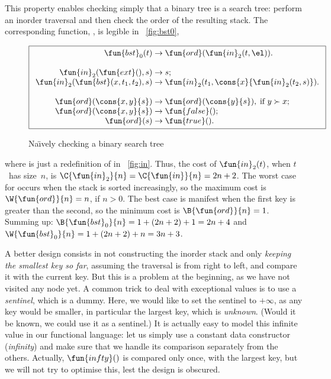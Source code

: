 This property enables checking simply that a binary tree is a search
tree: perform an inorder traversal and then check the order of the
resulting stack. The corresponding function,
, is legible in
\fig~\vref{fig:bst0},
\begin{figure}[t]
\begin{equation*}
\boxed{
\begin{array}{r@{\;}l@{\;}l}
\fun{bst}_0(t) & \rightarrow & \fun{ord}(\fun{in}_2(t,\el)).\\
\\
\fun{in}_2(\fun{ext}(),s) & \rightarrow & s;\\
\fun{in}_2(\fun{bst}(x,t_1,t_2),s) & \rightarrow
  & \fun{in}_2(t_1,\cons{x}{\fun{in}_2(t_2,s)}).\\
\\
\fun{ord}(\cons{x,y}{s}) & \rightarrow & \fun{ord}(\cons{y}{s}),
\;\text{if \(y \succ x\)};\\
\fun{ord}(\cons{x,y}{s}) & \rightarrow & \fun{false}();\\
\fun{ord}(s) & \rightarrow & \fun{true}().
\end{array}}
\end{equation*}
\caption{Na\"{\i}vely checking a binary search tree}
\label{fig:bst0}
\end{figure}
where  is just a
redefinition of  in
\fig~\vref{fig:in}. Thus, the cost of \(\fun{in}_2(t)\), when
\(t\)~has size~\(n\), is \(\C{\fun{in}_2}{n} = \C{\fun{in}}{n} = 2n +
2\). The worst case for  occurs when
the stack is sorted increasingly, so the maximum cost is
\(\W{\fun{ord}}{n} = n\), if \(n > 0\). The best case is manifest when
the first key is greater than the second, so the minimum cost is
\(\B{\fun{ord}}{n} = 1\). Summing up: \(\B{\fun{bst}_0}{n} = 1 +
(2n+2) + 1 = 2n + 4\) and \(\W{\fun{bst}_0}{n} = 1 + (2n+2) + n = 3n +
3\).

A better design consists in not constructing the inorder stack and
only \emph{keeping the smallest key so far}, assuming the traversal is
from right to left, and compare it with the current key. But this is a
problem at the beginning, as we have not visited any node yet. A
common trick to deal with exceptional values is to use a
\emph{sentinel}, which is a dummy. Here, we would like
to set the sentinel to \(+\infty\), as any key would be smaller, in
particular the largest key, which is \emph{unknown}. (Would it be
known, we could use it as a sentinel.) It is actually easy to model
this infinite value in our functional language: let us simply use a
constant data constructor 
(\emph{infinity}) and make sure that we handle its comparison
separately from the others. Actually,
\(\fun{infty}()\) is compared only once,
with the largest key, but we will not try to optimise this, lest the
design is obscured.

